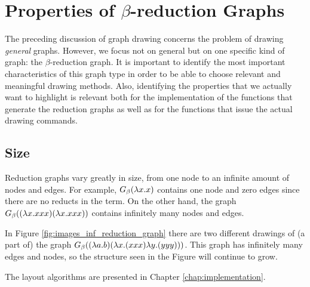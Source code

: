 
\chapter{Properties of $\beta$-reduction Graphs}

The preceding discussion of graph drawing concerns the problem of drawing
\emph{general} graphs. However, we focus not on general but on one specific
kind of graph: the $\beta$-reduction graph. It is important to identify the
most important characteristics of this graph type in order to be able to
choose relevant and meaningful drawing methods. Also, identifying the
properties that we actually want to highlight is relevant both for the
implementation of the functions that generate the reduction graphs as well as
for the functions that issue the actual drawing commands.

\section{Size}

Reduction graphs vary greatly in size, from one node to an infinite amount of
nodes and edges. For example, $G_\beta(\lambda x.x)$ contains one node and zero
edges since there are no reducts in the term. On the other hand, the graph
$G_\beta((\lambda x.xxx)(\lambda x.xxx))$ contains infinitely many nodes and
edges. 

In Figure \ref{fig:images_inf_reduction_graph} there are two different
drawings of (a part of) the graph $G_\beta((\lambda a.b) (\lambda x.(xxx)
\lambda y.(yyy)))$. This graph has infinitely many edges and nodes, so the
structure seen in the Figure will continue to grow. 

The layout algorithms are presented in Chapter \ref{chap:implementation}.

